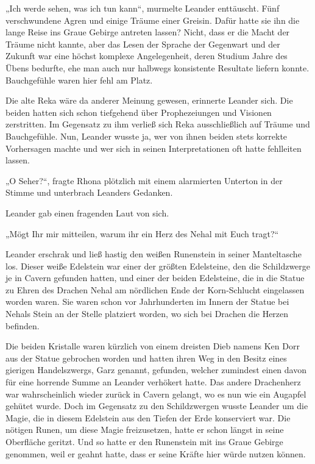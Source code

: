 „Ich werde sehen, was ich tun kann“, murmelte Leander enttäuscht. Fünf verschwundene Agren und einige Träume einer Greisin. Dafür hatte sie ihn die lange Reise ins Graue Gebirge antreten lassen? Nicht, dass er die Macht der Träume nicht kannte, aber das Lesen der Sprache der Gegenwart und der Zukunft war eine höchst komplexe Angelegenheit, deren Studium Jahre des Übens bedurfte, ehe man auch nur halbwegs konsistente Resultate liefern konnte. Bauchgefühle waren hier fehl am Platz.

Die alte Reka wäre da anderer Meinung gewesen, erinnerte Leander sich. Die beiden hatten sich schon tiefgehend über Prophezeiungen und Visionen zerstritten. Im Gegensatz zu ihm verließ sich Reka ausschließlich auf Träume und Bauchgefühle. Nun, Leander wusste ja, wer von ihnen beiden stets korrekte Vorhersagen machte und wer sich in seinen Interpretationen oft hatte fehlleiten lassen.

„O Seher?“, fragte Rhona plötzlich mit einem alarmierten Unterton in der Stimme und unterbrach Leanders Gedanken.

Leander gab einen fragenden Laut von sich.

„Mögt Ihr mir mitteilen, warum ihr ein Herz des Nehal mit Euch tragt?“

Leander erschrak und ließ hastig den weißen Runenstein in seiner Manteltasche los. Dieser weiße Edelstein war einer der größten Edelsteine, den die Schildzwerge je in Cavern gefunden hatten, und einer der beiden Edelsteine, die in die Statue zu Ehren des Drachen Nehal am nördlichen Ende der Korn-Schlucht eingelassen worden waren. Sie waren schon vor Jahrhunderten im Innern der Statue bei Nehals Stein an der Stelle platziert worden, wo sich bei Drachen die Herzen befinden.

Die beiden Kristalle waren kürzlich von einem dreisten Dieb namens Ken Dorr aus der Statue gebrochen worden und hatten ihren Weg in den Besitz eines gierigen Handelszwergs, Garz genannt, gefunden, welcher zumindest einen davon für eine horrende Summe an Leander verhökert hatte. Das andere Drachenherz war wahrscheinlich wieder zurück in Cavern gelangt, wo es nun wie ein Augapfel gehütet wurde. Doch im Gegensatz zu den Schildzwergen wusste Leander um die Magie, die in diesem Edelstein aus den Tiefen der Erde konserviert war. Die nötigen Runen, um diese Magie freizusetzen, hatte er schon längst in seine Oberfläche geritzt. Und so hatte er den Runenstein mit ins Graue Gebirge genommen, weil er geahnt hatte, dass er seine Kräfte hier würde nutzen können.

